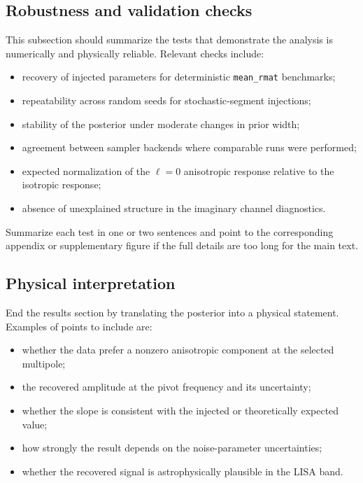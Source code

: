 \documentclass[11pt]{article}
\begin{document}
\subsection{Robustness and validation checks}

This subsection should summarize the tests that demonstrate the analysis is numerically and physically reliable. Relevant checks include:
\begin{itemize}[leftmargin=2.2em]
  \item recovery of injected parameters for deterministic \texttt{mean\_rmat} benchmarks;
  \item repeatability across random seeds for stochastic-segment injections;
  \item stability of the posterior under moderate changes in prior width;
  \item agreement between sampler backends where comparable runs were performed;
  \item expected normalization of the $\ell=0$ anisotropic response relative to the isotropic response;
  \item absence of unexplained structure in the imaginary channel diagnostics.
\end{itemize}

Summarize each test in one or two sentences and point to the corresponding appendix or supplementary figure if the full details are too long for the main text.

\subsection{Physical interpretation}

End the results section by translating the posterior into a physical statement. Examples of points to include are:
\begin{itemize}[leftmargin=2.2em]
  \item whether the data prefer a nonzero anisotropic component at the selected multipole;
  \item the recovered amplitude at the pivot frequency and its uncertainty;
  \item whether the slope is consistent with the injected or theoretically expected value;
  \item how strongly the result depends on the noise-parameter uncertainties;
  \item whether the recovered signal is astrophysically plausible in the LISA band.
\end{itemize}
\end{document}
